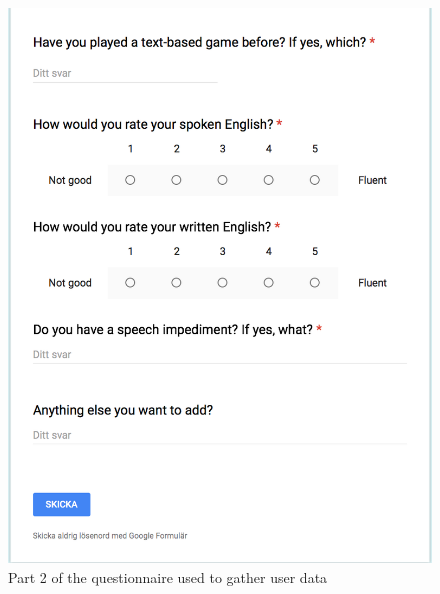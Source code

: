 \documentclass[a4paper,12pt]{kth-mag}
\begin{document}
\begin{figure}[ht]
	\centering
	\includegraphics[keepaspectratio, scale = 0.8]{images/user_data_2.png}
	\caption{\small{Part 2 of the questionnaire used to gather user data}}\label{fig:ud_2}
\end{figure}
\end{document}

